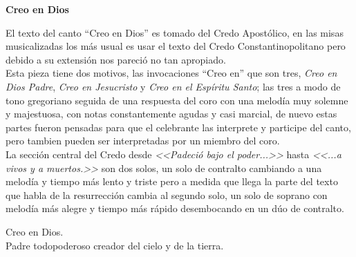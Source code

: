 \documentclass[12pt, letterpaper]{report}
\begin{document}
    {%
\parindent 0pt
\noindent
\ifx\preLilyPondExample \undefined
\else
  \expandafter\preLilyPondExample
\fi
\def\lilypondbook{}%
%
\ifx\postLilyPondExample \undefined
\else
  \expandafter\postLilyPondExample
\fi
}
    \clearpage

    {%
\parindent 0pt
\noindent
\ifx\preLilyPondExample \undefined
\else
  \expandafter\preLilyPondExample
\fi
\def\lilypondbook{}%
%
\ifx\postLilyPondExample \undefined
\else
  \expandafter\postLilyPondExample
\fi
}
    \clearpage

    {%
\parindent 0pt
\noindent
\ifx\preLilyPondExample \undefined
\else
  \expandafter\preLilyPondExample
\fi
\def\lilypondbook{}%
%
\ifx\postLilyPondExample \undefined
\else
  \expandafter\postLilyPondExample
\fi
}
    \clearpage

    \begin{center}
      \LARGE \textbf{Creo en Dios}
    \end{center}

    \Large El texto del canto ``Creo en Dios'' es tomado del Credo Apost\'olico, en las misas musicalizadas los m\'as usual es usar el texto del Credo Constantinopolitano pero debido a su extensi\'on nos pareci\'o no tan apropiado.\\
    Esta pieza tiene dos motivos, las invocaciones ``Creo en'' que son tres, \textit{Creo en Dios Padre}, \textit{Creo en Jesucristo} y \textit{Creo en el Esp\'iritu Santo}; las tres a modo de tono gregoriano seguida de una respuesta del coro con una melod\'ia muy solemne y majestuosa, con notas constantemente agudas y casi marcial, de nuevo estas partes fueron pensadas para que el celebrante las interprete y participe del canto, pero tambien pueden ser interpretadas por un miembro del coro.\\ La secci\'on central del Credo desde \textit{<<Padeci\'o bajo el poder...>>} hasta \textit{<<...a vivos y a muertos.>>} son dos solos, un solo de contralto cambiando a una melod\'ia y tiempo m\'as lento y triste pero a medida que llega la parte del texto que habla de la resurrecci\'on cambia al segundo solo, un solo de soprano con melod\'ia m\'as alegre y tiempo m\'as r\'apido desembocando en un d\'uo de contralto.

    \noindent
    \LARGE Creo en Dios.\\
    Padre todopoderoso creador del cielo y de la tierra.
\end{document}
